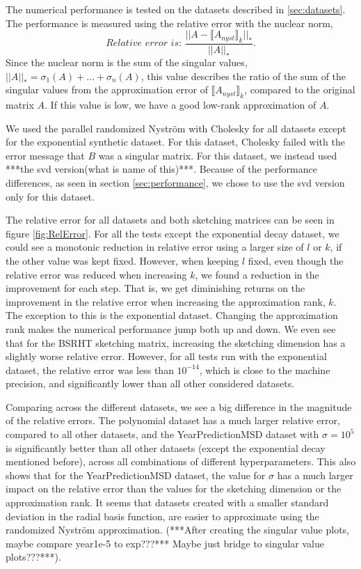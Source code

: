 \documentclass{article}
\theoremstyle{definition}
\begin{document}
The numerical performance is tested on the datasets described in \ref{sec:datasets}. The performance is measured using the relative error with the nuclear norm,
\begin{equation}
    \textit{Relative error is: } \frac{||A-\llbracket A_{nyst}\rrbracket_k||_*}{||A||_*}.
\end{equation}
Since the nuclear norm is the sum of the singular values, $||A||_*=\sigma_1(A)+...+\sigma_n(A)$, this value describes the ratio of the sum of the singular values from the approximation error of $\llbracket A_{nyst}\rrbracket_k$, compared to the original matrix $A$. If this value is low, we have a good low-rank approximation of $A$. \newline

We used the parallel randomized Nyström with Cholesky for all datasets except for the exponential synthetic dataset. For this dataset, Cholesky failed with the error message that $B$ was a singular matrix. For this dataset, we instead used ***the svd version(what is name of this)***. Because of the performance differences, as seen in section \ref{sec:performance}, we chose to use the svd version only for this dataset.\newline

The relative error for all datasets and both sketching matrices can be seen in figure \ref{fig:RelError}. For all the tests except the exponential decay dataset, we could see a monotonic reduction in relative error using a larger size of $l$ or $k$, if the other value was kept fixed. However, when keeping $l$ fixed, even though the relative error was reduced when increasing $k$, we found a reduction in the improvement for each step. That is, we get diminishing returns on the improvement in the relative error when increasing the approximation rank, $k$. The exception to this is the exponential dataset. Changing the approximation rank makes the numerical performance jump both up and down. We even see that for the BSRHT sketching matrix, increasing the sketching dimension has a slightly worse relative error. However, for all tests run with the exponential dataset, the relative error was less than $10^{-14}$, which is close to the machine precision, and significantly lower than all other considered datasets. \newline

Comparing across the different datasets, we see a big difference in the magnitude of the relative errors. The polynomial dataset has a much larger relative error, compared to all other datasets, and the YearPredictionMSD dataset with $\sigma=10^5$ is significantly better than all other datasets (except the exponential decay mentioned before), across all combinations of different hyperparameters. This also shows that for the YearPredictionMSD dataset, the value for $\sigma$ has a much larger impact on the relative error than the values for the sketching dimension or the approximation rank. It seems that datasets created with a smaller standard deviation in the radial basis function, are easier to approximate using the randomized Nyström approximation. (***After creating the singular value plots, maybe compare year1e-5 to exp???*** Maybe just bridge to singular value plots???***). \newline
\end{document}
